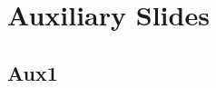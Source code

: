 \documentclass{beamer}
\begin{document}
\appendix
\section{Auxiliary Slides}


\subsection{Aux1}
%
%
%
%
%
%
%
%
%
%
%
\end{document}
